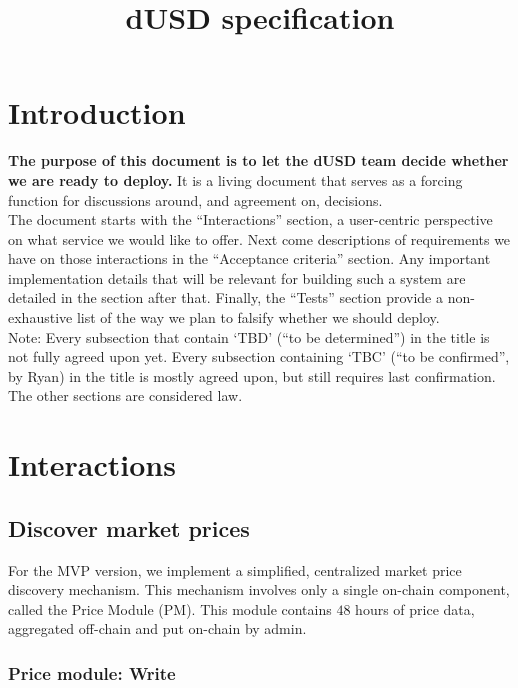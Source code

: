 \documentclass{article} %
\title{dUSD specification}
\begin{document}
\maketitle

\tableofcontents
\newpage

\section{Introduction}

\textbf{The purpose of this document is to let the dUSD team decide whether we are ready to deploy.}
It is a living document that serves as a forcing function for discussions
around, and agreement on, decisions. \\

The document starts with the ``Interactions'' section, a user-centric
perspective on what service we would like to offer.
Next come descriptions of requirements we have on those interactions in the
``Acceptance criteria'' section.
Any important implementation details that will be relevant for building such a
system are detailed in the section after that.
Finally, the ``Tests'' section provide a non-exhaustive list of the way we plan
to falsify whether we should deploy. \\

Note: Every subsection that contain `TBD' (``to be determined'') in the title is
not fully agreed upon yet.
Every subsection containing `TBC' (``to be confirmed'', by Ryan) in the title is
mostly agreed upon, but still requires last confirmation.
The other sections are considered law.

\section{Interactions}

\subsection{Discover market prices}

For the MVP version, we implement a simplified, centralized market price
discovery mechanism.
This mechanism involves only a single on-chain component, called the Price
Module (PM).
This module contains $48$ hours of price data, aggregated off-chain and put
on-chain by admin.

\subsubsection*{Price module: Write}
\end{document}
